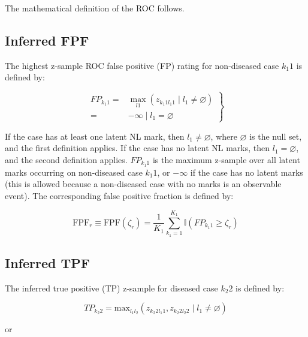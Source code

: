 \documentclass[
]{book}
\begin{document}
The mathematical definition of the ROC follows.

\hypertarget{inferred-fpf}{%
\subsection{Inferred FPF}\label{inferred-fpf}}

The highest z-sample ROC false positive (FP) rating for non-diseased case \(k_1 1\) is defined by:

\begin{equation}
\left.
\begin{aligned}
FP_{k_1 1}=&\max_{l1} \left ( z_{k_1 1 l_1 1 } \mid l_1 \neq \varnothing \right ) \\
=& -\infty \mid l_1 = \varnothing  
 \end{aligned}
\right \}
\label{eq:froc-empirical-FP}
\end{equation}

If the case has at least one latent NL mark, then \(l_1 \neq \varnothing\), where \(\varnothing\) is the null set, and the first definition applies. If the case has no latent NL marks, then \(l_1 = \varnothing\), and the second definition applies. \(FP_{k_1 1}\) is the maximum z-sample over all latent marks occurring on non-diseased case \(k_1 1\), or \(-\infty\) if the case has no latent marks (this is allowed because a non-diseased case with no marks is an observable event). The corresponding false positive fraction is defined by:

\begin{equation}
\text{FPF}_r \equiv \text{FPF} \left ( \zeta_r \right ) = \frac{1}{K_1} \sum_{k_1=1}^{K_1} \mathbb{I} \left ( FP_{k_1 1} \geq \zeta_r\right )
\label{eq:froc-empirical-FPF}
\end{equation}

\hypertarget{inferred-tpf}{%
\subsection{Inferred TPF}\label{inferred-tpf}}

The inferred true positive (TP) z-sample for diseased case \(k_2 2\) is defined by:

\begin{equation}
TP_{k_2 2} = \text{max}_{l_1 l_2}\left ( z_{k_2 2 l_1 1} ,z_{k_2 2 l_2 2} \mid l_1 \neq \varnothing \right )
\label{eq:froc-empirical-TP1}
\end{equation}

or
\end{document}
